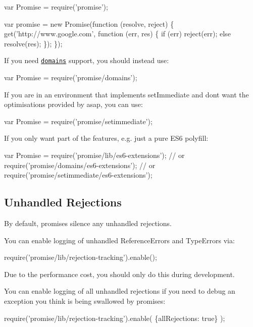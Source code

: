 \begin{DoxyCode}
var Promise = require('promise');

var promise = new Promise(function (resolve, reject) \{
  get('http://www.google.com', function (err, res) \{
    if (err) reject(err);
    else resolve(res);
  \});
\});
\end{DoxyCode}


If you need \href{https://iojs.org/api/domain.html}{\tt domains} support, you should instead use\+:


\begin{DoxyCode}
var Promise = require('promise/domains');
\end{DoxyCode}


If you are in an environment that implements {\ttfamily set\+Immediate} and don\textquotesingle{}t want the optimisations provided by asap, you can use\+:


\begin{DoxyCode}
var Promise = require('promise/setimmediate');
\end{DoxyCode}


If you only want part of the features, e.\+g. just a pure E\+S6 polyfill\+:


\begin{DoxyCode}
var Promise = require('promise/lib/es6-extensions');
// or require('promise/domains/es6-extensions');
// or require('promise/setimmediate/es6-extensions');
\end{DoxyCode}


\subsection*{Unhandled Rejections}

By default, promises silence any unhandled rejections.

You can enable logging of unhandled Reference\+Errors and Type\+Errors via\+:


\begin{DoxyCode}
require('promise/lib/rejection-tracking').enable();
\end{DoxyCode}


Due to the performance cost, you should only do this during development.

You can enable logging of all unhandled rejections if you need to debug an exception you think is being swallowed by promises\+:


\begin{DoxyCode}
require('promise/lib/rejection-tracking').enable(
  \{allRejections: true\}
);
\end{DoxyCode}


